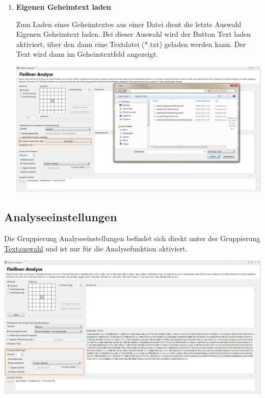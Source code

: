 \documentclass[fontsize=12pt, DIV=15, parskip=half-]{scrartcl}
\theoremstyle{break}
\begin{document}
\begin{enumerate}[label=(\alph*), leftmargin=*]
\item \textbf{Eigenen Geheimtext laden}

Zum Laden eines Geheimtextes aus einer Datei dient die letzte Auswahl \glqq Eigenen Geheimtext laden\grqq.
Bei dieser Auswahl wird der Button \glqq Text laden\grqq{} aktiviert, über den dann eine Textdatei (*.txt) geladen werden kann. Der Text wird dann im Geheimtextfeld angezeigt.

\includegraphics[scale=0.4]{FleissnerCipherLoadOwn.png}
\end{enumerate} 


\subsection{Analyseeinstellungen}
Die Gruppierung \glqq Analyseeinstellungen\grqq{} befindet sich direkt unter der Gruppierung \glqq\hyperlink{txtausw}{Textauswahl}\grqq{} und ist nur für die Analysefunktion aktiviert.

\includegraphics[scale=0.45]{FleissnerAnalysisSettings.png}
\end{document}
